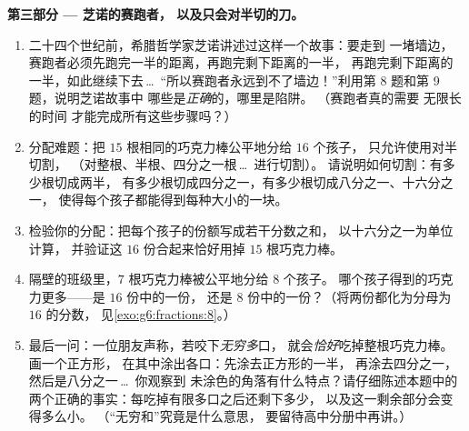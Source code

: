 \begin{problem}
\medskip
\noindent\textbf{第三部分 --- 芝诺的赛跑者，
以及只会对半切的刀。}
\begin{enumerate}[resume]
  \item 二十四个世纪前，希腊哲学家芝诺讲述过这样一个故事：要走到
        一堵墙边，赛跑者必须先跑完一半的距离，再跑完剩下距离的一半，
        再跑完剩下距离的一半，如此继续下去\,\dots\
        “所以赛跑者永远到不了墙边！”利用第 8 题和第 9 题，说明芝诺故事中
        哪些是\emph{正确}的，哪里是陷阱。
        （赛跑者真的需要
        无限长的时间
        才能完成所有这些步骤吗？）
  \item 分配难题：把 $15$ 根相同的巧克力棒公平地分给 $16$ 个孩子，
        只允许使用对半切割，
        （对整根、半根、四分之一根\,\dots\ 进行切割）。
        请说明如何切割：有多少根切成两半，
        有多少根切成四分之一，有多少根切成八分之一、十六分之一，
        使得每个孩子都能得到每种大小的一块。
  \item 检验你的分配：把每个孩子的份额写成若干分数之和，
        以十六分之一为单位计算，
        并验证这 $16$ 份合起来恰好用掉 $15$ 根巧克力棒。
  \item 隔壁的班级里，$7$ 根巧克力棒被公平地分给 $8$ 个孩子。
        哪个孩子得到的巧克力更多——是 $16$ 份中的一份，
        还是 $8$ 份中的一份？（将两份都化为分母为 $16$ 的分数，
        见\cref{exo:g6:fractions:8}。）
  \item 最后一问：一位朋友声称，若咬下\emph{无穷多}口，
        就会\emph{恰好}吃掉整根巧克力棒。画一个正方形，
        在其中涂出各口：先涂去正方形的一半，
        再涂去四分之一，然后是八分之一\,\dots\ 你观察到
        未涂色的角落有什么特点？请仔细陈述本题中的
        两个正确的事实：每吃掉有限多口之后还剩下多少，
        以及这一剩余部分会变得多么小。
        （“无穷和”究竟是什么意思，
        要留待高中分册中再讲。）
\end{enumerate}
\end{problem}
